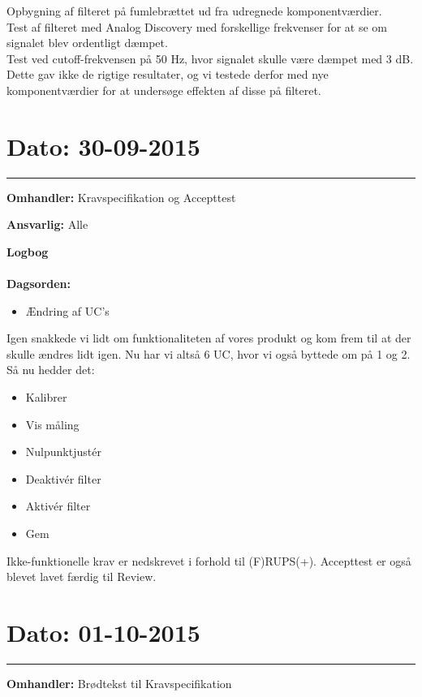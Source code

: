 Opbygning af filteret på fumlebrættet ud fra udregnede komponentværdier. \\
Test af filteret med Analog Discovery med forskellige frekvenser for at se om signalet blev ordentligt dæmpet. \\
Test ved cutoff-frekvensen på 50 Hz, hvor signalet skulle være dæmpet med 3 dB.\\
Dette gav ikke de rigtige resultater, og vi testede derfor med nye komponentværdier for at undersøge effekten af disse på filteret. 
	
	
	
\section{Dato: 30-09-2015 }
\hrule

\textbf{Omhandler:} Kravspecifikation og Accepttest  

\textbf{Ansvarlig:} Alle 

\textbf{Logbog}
\\
\\
\textbf{Dagsorden:}
\begin{itemize}
\item Ændring af UC's
\end{itemize}
	
Igen snakkede vi lidt om funktionaliteten af vores produkt og kom frem til at der skulle ændres lidt igen. Nu har vi altså 6 UC, hvor vi også byttede om på 1 og 2. Så nu hedder det: 
\begin{itemize}
	\item Kalibrer
	\item Vis måling 
	\item Nulpunktjustér 
	\item Deaktivér filter 
	\item Aktivér filter
	\item Gem 
\end{itemize}

Ikke-funktionelle krav er nedskrevet i forhold til (F)RUPS(+). Accepttest er også blevet lavet færdig til Review. 

	
	

\section{Dato: 01-10-2015 }
\hrule

\textbf{Omhandler:} Brødtekst til Kravspecifikation 

